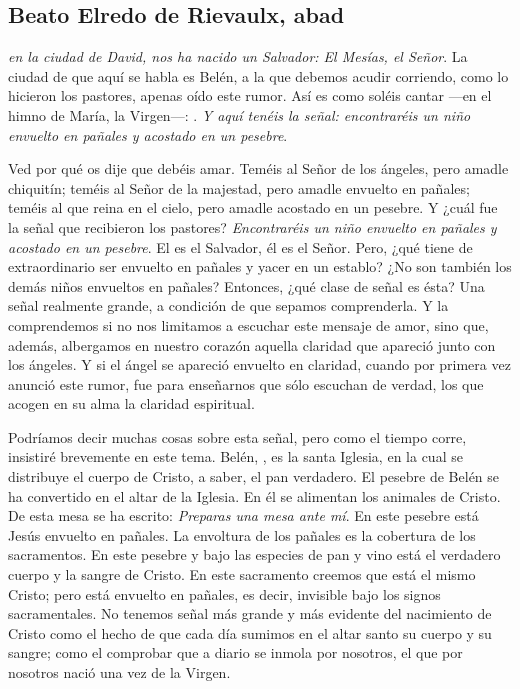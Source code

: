 \subsection{Beato Elredo de Rievaulx, abad}



\begin{body}
	 \emph{en la ciudad de David, nos ha nacido un Salvador: El Mesías, el Señor}. La ciudad de que aquí se habla es Belén, a la que debemos acudir corriendo, como lo hicieron los pastores, apenas oído este rumor. Así es como soléis cantar ---en el himno de María, la Virgen---: . \emph{Y aquí tenéis la señal: encontraréis un niño envuelto en pañales y acostado en un pesebre}.
	
	Ved por qué os dije que debéis amar. Teméis al Señor de los ángeles, pero amadle chiquitín; teméis al Señor de la majestad, pero amadle envuelto en pañales; teméis al que reina en el cielo, pero amadle acostado en un pesebre. Y ¿cuál fue la señal que recibieron los pastores? \emph{Encontraréis un niño envuelto en pañales y acostado en un pesebre}. El es el Salvador, él es el Señor. Pero, ¿qué tiene de extraordinario ser envuelto en pañales y yacer en un establo? ¿No son también los demás niños envueltos en pañales? Entonces, ¿qué clase de señal es ésta? Una señal realmente grande, a condición de que sepamos comprenderla. Y la comprendemos si no nos limitamos a escuchar este mensaje de amor, sino que, además, albergamos en nuestro corazón aquella claridad que apareció junto con los ángeles. Y si el ángel se apareció envuelto en claridad, cuando por primera vez anunció este rumor, fue para enseñarnos que sólo escuchan de verdad, los que acogen en su alma la claridad espiritual.
	
	Podríamos decir muchas cosas sobre esta señal, pero como el tiempo corre, insistiré brevemente en este tema. Belén, , es la santa Iglesia, en la cual se distribuye el cuerpo de Cristo, a saber, el pan verdadero. El pesebre de Belén se ha convertido en el altar de la Iglesia. En él se alimentan los animales de Cristo. De esta mesa se ha escrito: \emph{Preparas una mesa ante mí}. En este pesebre está Jesús envuelto en pañales. La envoltura de los pañales es la cobertura de los sacramentos. En este pesebre y bajo las especies de pan y vino está el verdadero cuerpo y la sangre de Cristo. En este sacramento creemos que está el mismo Cristo; pero está envuelto en pañales, es decir, invisible bajo los signos sacramentales. No tenemos señal más grande y más evidente del nacimiento de Cristo como el hecho de que cada día sumimos en el altar santo su cuerpo y su sangre; como el comprobar que a diario se inmola por nosotros, el que por nosotros nació una vez de la Virgen.
	

\end{body}
